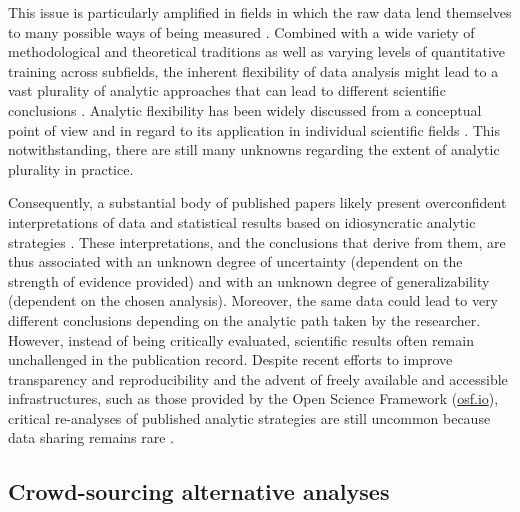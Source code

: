 \documentclass[Review,times,sageh]{sagej}
\begin{document}
This issue is particularly amplified in fields in which the raw data lend themselves to many possible ways of being measured \citep{roettger2019researcher}.
Combined with a wide variety of methodological and theoretical traditions as well as varying levels of quantitative training across subfields, the inherent flexibility of data analysis might lead to a vast plurality of analytic approaches that can lead to different scientific conclusions \citep{roettger2019emergent}.
Analytic flexibility has been widely discussed from a conceptual point of view \citep{simmons2011false, wagenmakers2012agenda, nosek2014method} and in regard to its application in individual scientific fields \citep[e.g.][]{wicherts2016, charles2019, roettger2019researcher}.
This notwithstanding, there are still many unknowns regarding the extent of analytic plurality in practice.

Consequently, a substantial body of published papers likely present overconfident interpretations of data and statistical results based on idiosyncratic analytic strategies \citep[e.g.,][]{simmons2011false, gelman2014statistical}.
These interpretations, and the conclusions that derive from them, are thus associated with an unknown degree of uncertainty (dependent on the strength of evidence provided) and with an unknown degree of generalizability (dependent on the chosen analysis).
Moreover, the same data could lead to very different conclusions depending on the analytic path taken by the researcher.
However, instead of being critically evaluated, scientific results often remain unchallenged in the publication record.
Despite recent efforts to improve transparency and reproducibility \citep[e.g.][]{miguel2014promoting, klein2018practical} and the advent of freely available and accessible infrastructures, such as those provided by the Open Science Framework (\href{https://osf.io}{osf.io}), critical re-analyses of published analytic strategies are still uncommon because data sharing remains rare \citep{wicherts2006poor}.

\hypertarget{crowd-sourcing-alternative-analyses}{%
\subsection{Crowd-sourcing alternative analyses}\label{crowd-sourcing-alternative-analyses}}
\end{document}
